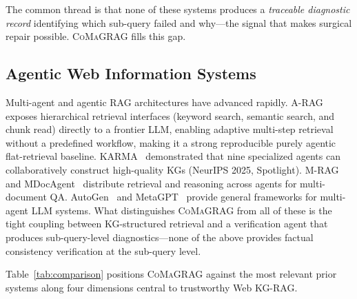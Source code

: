 \documentclass[runningheads]{llncs}
\newcommand{\sys}{\textsc{CoMaGRAG}\xspace}
\begin{document}
The common thread is that none of these systems produces a \emph{traceable
diagnostic record} identifying which sub-query failed and why---the signal
that makes surgical repair possible. \sys fills this gap.

\subsection{Agentic Web Information Systems}

Multi-agent and agentic RAG architectures have advanced rapidly.
A-RAG~\cite{arag2026} exposes hierarchical retrieval interfaces (keyword
search, semantic search, and chunk read) directly to a frontier LLM, enabling
adaptive multi-step retrieval without a predefined workflow, making it a strong
reproducible purely agentic flat-retrieval baseline.
KARMA~\cite{karma2025} demonstrated that nine specialized agents can
collaboratively construct high-quality KGs (NeurIPS 2025, Spotlight).
M-RAG~\cite{wang2024mrag} and MDocAgent~\cite{han2025mdocagent} distribute
retrieval and reasoning across agents for multi-document QA.
AutoGen~\cite{wu2023autogen} and MetaGPT~\cite{hong2024metagpt} provide
general frameworks for multi-agent LLM systems. What distinguishes \sys from
all of these is the tight coupling between KG-structured retrieval and a
verification agent that produces sub-query-level diagnostics---none of the
above provides factual consistency verification at the sub-query level.

Table~\ref{tab:comparison} positions \sys against the most relevant prior
systems along four dimensions central to trustworthy Web KG-RAG.
\end{document}
